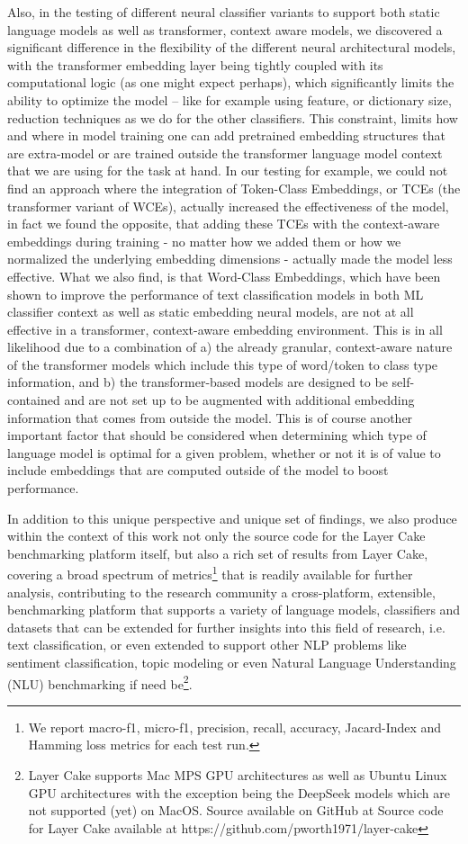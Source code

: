 \documentclass[final]{clv2025}
\begin{document}
Also, in the testing of different neural classifier variants to support both static language models as well as transformer, context aware models, we discovered a significant difference in the flexibility of the different neural architectural models, with the transformer embedding layer being tightly coupled with its computational logic (as one might expect perhaps), which significantly limits the ability to optimize the model – like for example using feature, or dictionary size, reduction techniques as we do for the other classifiers. This constraint, limits how and where in model training one can add pretrained embedding structures that are extra-model or are trained outside the transformer language model context that we are using for the task at hand.  In our testing for example, we could not find an approach where the integration of Token-Class Embeddings, or TCEs (the transformer variant of WCEs), actually increased the effectiveness of the model, in fact we found the opposite, that adding these TCEs with the context-aware embeddings during training - no matter how we added them or how we normalized the underlying embedding dimensions - actually made the model less effective. What we also find, is that Word-Class Embeddings, which have been shown to improve the performance of text classification models in both ML classifier context as well as static embedding neural models, are not at all effective in a transformer, context-aware embedding environment. This is in all likelihood due to a combination of a) the already granular, context-aware nature of the transformer models which include this type of word/token to class type information, and b) the transformer-based models are designed to be self-contained and are not set up to be augmented with additional embedding information that comes from outside the model. This is of course another important factor that should be considered when determining which type of language model is optimal for a given problem, whether or not it is of value to include embeddings that are computed outside of the model to boost performance.

In addition to this unique perspective and unique set of findings, we also produce within the context of this work not only the source code for the Layer Cake benchmarking platform itself, but also a rich set of results from Layer Cake, covering a broad spectrum of metrics\footnote{We report macro-f1, micro-f1, precision, recall, accuracy, Jacard-Index and Hamming loss metrics for each test run.} that is readily available for further analysis, contributing to the research community a cross-platform, extensible, benchmarking platform that supports a variety of language models, classifiers and datasets that can be extended for further insights into this field of research, i.e. text classification, or even extended to support other NLP problems like sentiment classification, topic modeling or even Natural Language Understanding (NLU) benchmarking if need be\footnote{Layer Cake supports Mac MPS GPU architectures as well as Ubuntu Linux GPU architectures with the exception being the DeepSeek models which are not supported (yet) on MacOS. Source available on GitHub at Source code for Layer Cake available at https://github.com/pworth1971/layer-cake}. 
\end{document}
